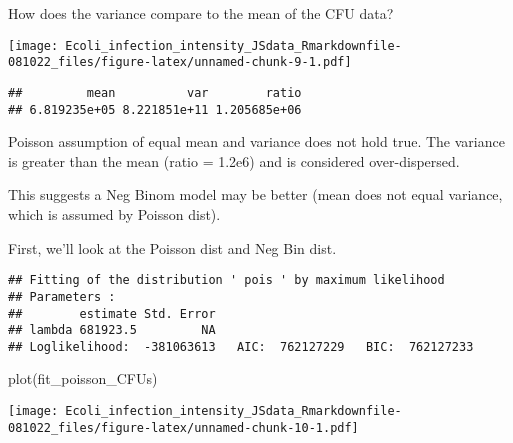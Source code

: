 \documentclass[
]{article}
\newenvironment{Shaded}{\begin{snugshade}}{\end{snugshade}}
\newcommand{\CommentTok}[1]{\textcolor[rgb]{0.56,0.35,0.01}{\textit{#1}}}
\newcommand{\FunctionTok}[1]{\textcolor[rgb]{0.00,0.00,0.00}{#1}}
\newcommand{\NormalTok}[1]{#1}
\newcommand{\OtherTok}[1]{\textcolor[rgb]{0.56,0.35,0.01}{#1}}
\newcommand{\SpecialCharTok}[1]{\textcolor[rgb]{0.00,0.00,0.00}{#1}}
\newcommand{\StringTok}[1]{\textcolor[rgb]{0.31,0.60,0.02}{#1}}
\begin{document}
How does the variance compare to the mean of the CFU data?

\texttt{[image: Ecoli\_infection\_intensity\_JSdata\_Rmarkdownfile-081022\_files/figure-latex/unnamed-chunk-9-1.pdf]}

\begin{verbatim}
##         mean          var        ratio 
## 6.819235e+05 8.221851e+11 1.205685e+06
\end{verbatim}

Poisson assumption of equal mean and variance does not hold true. The
variance is greater than the mean (ratio = 1.2e6) and is considered
over-dispersed.

This suggests a Neg Binom model may be better (mean does not equal
variance, which is assumed by Poisson dist).

First, we'll look at the Poisson dist and Neg Bin dist.

\begin{Shaded}
\end{Shaded}

\begin{verbatim}
## Fitting of the distribution ' pois ' by maximum likelihood 
## Parameters : 
##        estimate Std. Error
## lambda 681923.5         NA
## Loglikelihood:  -381063613   AIC:  762127229   BIC:  762127233
\end{verbatim}

\begin{Shaded}
\begin{Highlighting}[]
\FunctionTok{plot}\NormalTok{(fit\_poisson\_CFUs)}
\end{Highlighting}
\end{Shaded}

\texttt{[image: Ecoli\_infection\_intensity\_JSdata\_Rmarkdownfile-081022\_files/figure-latex/unnamed-chunk-10-1.pdf]}

\begin{Shaded}
\end{Shaded}
\end{document}
